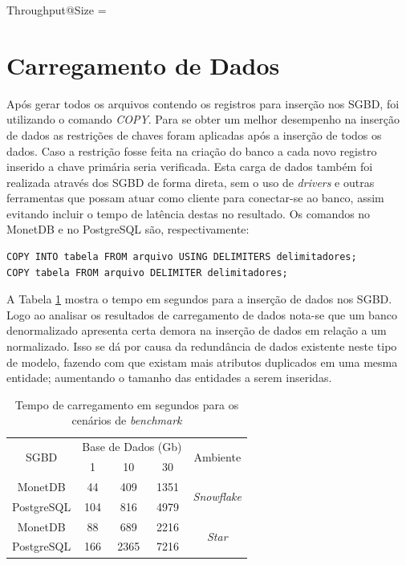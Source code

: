 \begin{myequation}%
\label{eq:2-2}
{\scriptstyle Throughput@Size} =  %
\end{myequation}
%

\section{Carregamento de Dados}

Após gerar todos os arquivos contendo os registros para inserção nos SGBD, foi utilizando o comando \textit{COPY}. Para se obter um melhor desempenho na inserção de dados as restrições de chaves foram aplicadas após a inserção de todos os dados. Caso a restrição fosse feita na criação do banco a cada novo registro inserido a chave primária seria verificada. Esta carga de dados também foi realizada através dos SGBD de forma direta, sem o uso de \textit{drivers} e outras ferramentas que possam atuar como cliente para conectar-se ao banco, assim evitando incluir o tempo de latência destas no resultado. Os comandos no MonetDB e no PostgreSQL são, respectivamente:

\begin{verbatim}
COPY INTO tabela FROM arquivo USING DELIMITERS delimitadores;
COPY tabela FROM arquivo DELIMITER delimitadores;
\end{verbatim}

A Tabela \ref{tab:carregamento} mostra o tempo em segundos para a inserção de dados nos SGBD. Logo ao analisar os resultados de carregamento de dados nota-se que um banco denormalizado apresenta certa demora na inserção de dados em relação a um normalizado. Isso se dá por causa da redundância de dados existente neste tipo de modelo, fazendo com que existam mais atributos duplicados em uma mesma entidade; aumentando o tamanho das entidades a serem inseridas. 

\begin{table}[htpb]
        \centering
        \caption{Tempo de carregamento em segundos para os cenários de \textit{benchmark}}
        \label{tab:carregamento}
        \begin{tabular}{c|ccc|c}
        \hline
        \multirow{2}{*}{SGBD} & \multicolumn{3}{c|}{Base de Dados (Gb)} & \multirow{2}{*}{Ambiente}  \\
                              & 1           & 10          & 30          &                            \\ \hline
        MonetDB               & 44          & 409         & 1351        & \multirow{2}{*}{\textit{Snowflake}} \\
        PostgreSQL            & 104         & 816         & 4979        &                            \\ \hline
        MonetDB               & 88          & 689         & 2216        & \multirow{2}{*}{\textit{Star}}      \\
        PostgreSQL            & 166         & 2365        & 7216        &                            \\ \hline
        \end{tabular}
    \end{table}

